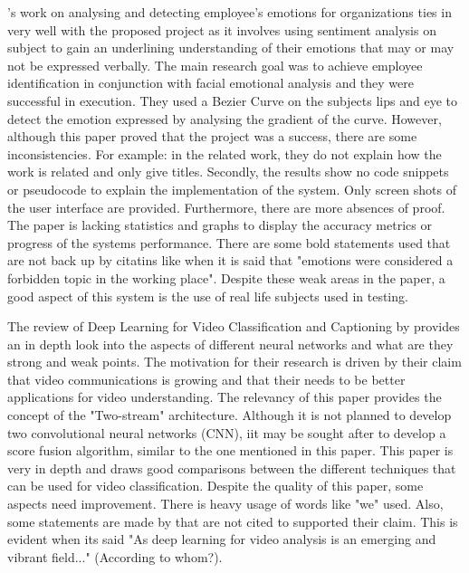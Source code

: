 \citealp{SUBHASHINI}'s work on analysing and detecting employee's emotions for organizations ties in very well with the proposed project as it involves using sentiment analysis on subject to gain an underlining understanding of their emotions that may or may not be expressed verbally. The main research goal was to achieve employee identification in conjunction with facial emotional analysis and they were successful in execution. They used a Bezier Curve on the subjects lips and eye to detect the emotion expressed by analysing the gradient of the curve. However, although this paper proved that the project was a success, there are some inconsistencies. For example: in the related work, they do not explain how the work is related and only give titles. Secondly, the results show no code snippets or pseudocode to explain the implementation of the system. Only screen shots of the user interface are provided. Furthermore, there are more absences of proof. The paper is lacking statistics and graphs to display the accuracy metrics or progress of the systems performance. There are some bold statements used that are not back up by citatins like when it is said that "emotions were considered a forbidden topic in the working place". Despite these weak areas in the paper, a good aspect of this system is the use of real life subjects used in testing. 

The review of Deep Learning for Video Classification and Captioning by \citeauthor{Wu} provides an in depth look into the aspects of different neural networks and what are they strong and weak points. The motivation for their research is driven by their claim that video communications is growing and that their needs to be better applications for video understanding. The relevancy of this paper provides the concept of the "Two-stream" architecture. Although it is not planned to develop two convolutional neural networks (CNN), iit may be sought after to develop a score fusion algorithm, similar to the one mentioned in this paper. This paper is very in depth and draws good comparisons between the different techniques that can be used for video classification. Despite the quality of this paper, some aspects need improvement. There is heavy usage of words like "we" used. Also, some statements are made by \citep{Wu} that are not cited to supported their claim. This is evident when its said "As deep learning for video analysis is an emerging and vibrant field..." (According to whom?).

